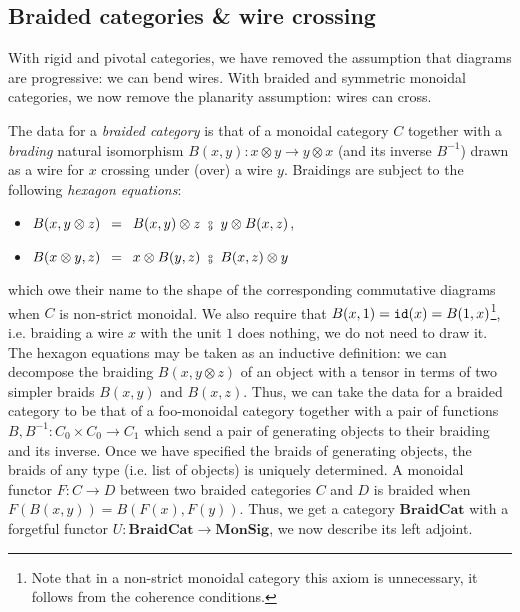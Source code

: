 
\subsection{Braided categories \& wire crossing} \label{subsection:symmetric}

With rigid and pivotal categories, we have removed the assumption that diagrams are progressive: we can bend wires.
With braided and symmetric monoidal categories, we now remove the planarity assumption: wires can cross.

The data for a \emph{braided category} is that of a monoidal category $C$ together with a \emph{brading} natural isomorphism $B(x, y) : x \otimes y \to y \otimes x$ (and its inverse $B^{-1}$) drawn as a wire for $x$ crossing under (over) a wire $y$.
Braidings are subject to the following \emph{hexagon equations}:
\begin{itemize}
\item $B(x, y \otimes z) \s = \s B(x,y) \otimes z \ \fcmp \ y \otimes B(x,z)$,
\item $B(x \otimes y, z) \s = \s x \otimes B(y,z) \ \fcmp \ B(x,z) \otimes y$
\end{itemize}
which owe their name to the shape of the corresponding commutative diagrams when $C$ is non-strict monoidal.
We also require that $B(x, 1) = \mathtt{id}(x) = B(1, x)$\footnote
{Note that in a non-strict monoidal category this axiom is unnecessary, it follows from the coherence conditions.},
i.e. braiding a wire $x$ with the unit $1$ does nothing, we do not need to draw it.
The hexagon equations may be taken as an inductive definition: we can decompose the braiding $B(x, y \otimes z)$ of an object with a tensor in terms of two simpler braids $B(x,y)$ and $B(x,z)$.
Thus, we can take the data for a braided category to be that of a foo-monoidal category together with a pair of functions $B, B^{-1} : C_0 \times C_0 \to C_1$ which send a pair of generating objects to their braiding and its inverse.
Once we have specified the braids of generating objects, the braids of any type (i.e. list of objects) is uniquely determined.
A monoidal functor $F : C \to D$ between two braided categories $C$ and $D$ is braided when $F(B(x, y)) = B(F(x), F(y))$.
Thus, we get a category $\mathbf{BraidCat}$ with a forgetful functor $U : \mathbf{BraidCat} \to \mathbf{MonSig}$, we now describe its left adjoint.

